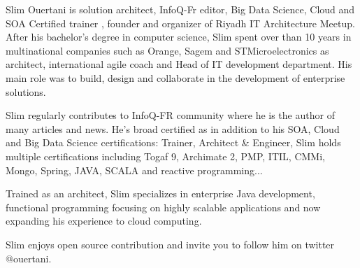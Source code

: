 \documentclass[10pt,a4paper]{article}
\begin{document}
\vspace{-1.3em}  %
\begin{multicols}{2}  %
\hspace{0.5cm} Slim Ouertani is solution architect, InfoQ-Fr editor, Big Data Science, Cloud and SOA Certified trainer , founder and organizer of Riyadh IT Architecture Meetup.
After his bachelor's degree in computer science, Slim spent over than 10 years in multinational companies such as Orange, Sagem and STMicroelectronics as architect, international agile coach and Head of IT development department.
His main role was to build, design and collaborate in the development of enterprise solutions.

\hspace{0.5cm} Slim regularly contributes to InfoQ-FR community where he is the author of many articles and news.
He's broad certified as in addition to his SOA, Cloud and Big Data Science certifications: Trainer, Architect \& Engineer, Slim  holds multiple certifications including Togaf 9, Archimate 2, PMP, ITIL, CMMi, Mongo, Spring, JAVA, SCALA and reactive programming...

\hspace{0.5cm} Trained as an architect, Slim specializes in enterprise Java development, functional programming focusing on highly scalable applications and now expanding his experience to cloud computing.

\hspace{0.5cm} Slim enjoys open source contribution and invite you to follow him on twitter @ouertani.

\end{multicols}


\spacedhrule{0em}{-0.4em}

\end{document}
